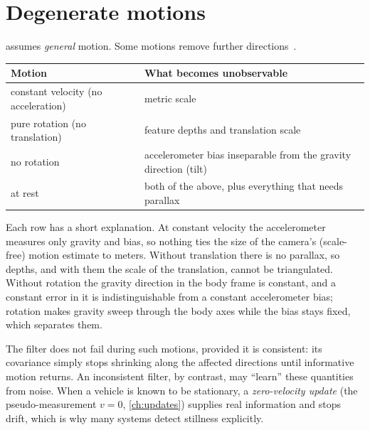 \section{Degenerate motions}

 assumes \emph{general} motion. Some motions remove further directions~\cite{yang2019degenerate}.
\begin{center}\small
\begin{tabular}{@{}l l@{}}
\toprule
Motion & What becomes unobservable \\
\midrule
constant velocity (no acceleration) & metric scale \\
pure rotation (no translation) & feature depths and translation scale \\
no rotation & accelerometer bias inseparable from the gravity direction (tilt) \\
at rest & both of the above, plus everything that needs parallax \\
\bottomrule
\end{tabular}
\end{center}
Each row has a short explanation. At constant velocity the accelerometer measures only gravity and bias, so nothing ties the size of the
camera's (scale-free) motion estimate to meters. Without translation there is no parallax, so depths, and with them the scale of the
translation, cannot be triangulated. Without rotation the gravity direction in the body frame is constant, and a constant error in it is
indistinguishable from a constant accelerometer bias; rotation makes gravity sweep through the body axes while the bias stays fixed, which
separates them.

The filter does not fail during such motions, provided it is consistent: its covariance simply stops shrinking along the
affected directions until informative motion returns. An inconsistent filter, by contrast, may ``learn'' these quantities from
noise. When a vehicle is known to be stationary, a \emph{zero-velocity update} (the pseudo-measurement $v = 0$, \cref{ch:updates}) supplies real
information and stops drift, which is why many systems detect stillness explicitly.

